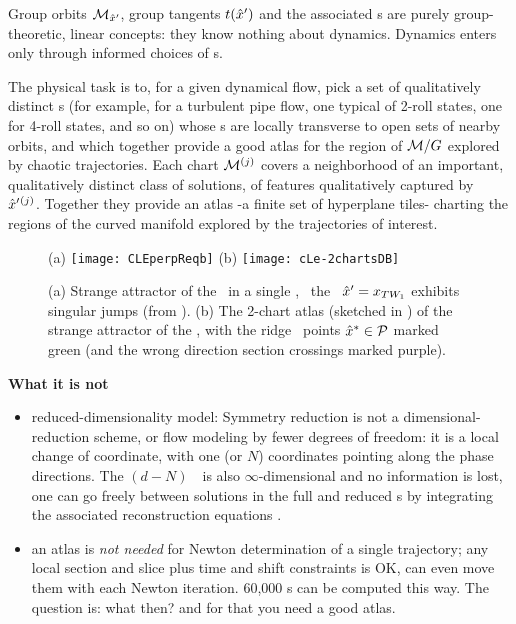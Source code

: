 \documentclass[aip,cha,reprint,
secnumarabic,
nofootinbib, tightenlines,
nobibnotes, showkeys, showpacs,
groupedaddress
]{revtex4-1}
\begin{document}
Group orbits ${\cal M}_{{\hat{x}'}}$, group tangents $t({\hat{x}'})$ and the
associated \slice s are purely group-theoretic, linear concepts: they
know nothing about dynamics. Dynamics enters only through informed
choices of \template s.

The physical task is to, for a given dynamical flow, pick a set of
qualitatively distinct {\template s} (for example, for a turbulent pipe
flow, one typical of 2-roll states, one for 4-roll states, and so on)
whose \slice s  are locally transverse to open sets of nearby orbits, and
which together provide a good atlas for the region of ${\cal M}/G$
explored by chaotic trajectories. Each chart ${\cal M}{}^{(j)}$ covers a
neighborhood of an important, qualitatively distinct class of solutions,
of features qualitatively captured by \template\ ${\hat{x}'}{}^{(j)}$.
Together they provide an atlas -a finite set of hyperplane tiles-
charting the regions of the curved manifold explored by the trajectories
of interest.

\begin{figure}
 \begin{center}
(a) \texttt{[image: CLEperpReqb]}
(b) \texttt{[image: cLe-2chartsDB]}
 \end{center}
  \caption{\label{fig:cLe-2charts}
(a)
Strange attractor of the \cLe\ in a single \slice, \template\
the \reqv\ ${\hat{x}'} = x_{TW_{1}}$ exhibits singular jumps
(from \refref{SiCvi10}).
(b)
The 2-chart atlas (sketched in ) of the strange
attractor of the \cLe, with the ridge \PoincSec\ points
$\hat{x}^* \in {\cal P}$ marked green (and the wrong direction section
crossings marked purple).
  }
\end{figure}


    \ifdraft\color{blue}
{\bf What it is not}
    \begin{itemize}
      \item reduced-dimensionality model: Symmetry reduction is not a
          dimensional-reduction scheme, or flow modeling by fewer degrees
          of freedom: it is a local change of coordinate, with one (or
          $N$) coordinates pointing along the phase directions. The
          $(d\!-\!N)$\dmn\ \reducedsp\ is also $\infty$-dimensional and
          no information is lost, one can go freely between solutions in
          the full and reduced \statesp s by integrating the associated
          {reconstruction equations} \refeq{reconstrEq}.
      \item an atlas is \emph{not needed} for Newton determination of a
            single trajectory; any local section and slice plus time and shift
            constraints is OK, can even move them with each Newton
            iteration. 60,000 \rpo s can be computed\rf{SCD07} this way.
            The question is: what then? and for that you need a good atlas.
    \end{itemize}
\end{document}
